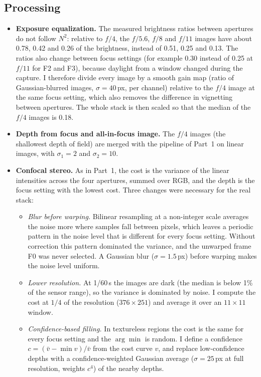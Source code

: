 \documentclass[11pt]{article}
\begin{document}
\subsection*{Processing}
\begin{itemize}\setlength{\itemsep}{2pt}
\item \textbf{Exposure equalization.} The measured brightness ratios between apertures do not follow $N^2$: relative to $f/4$, the $f/5.6$, $f/8$ and $f/11$ images have about 0.78, 0.42 and 0.26 of the brightness, instead of 0.51, 0.25 and 0.13. The ratios also change between focus settings (for example 0.30 instead of 0.25 at $f/11$ for F2 and F3), because daylight from a window changed during the capture. I therefore divide every image by a smooth gain map (ratio of Gaussian-blurred images, $\sigma=40$\,px, per channel) relative to the $f/4$ image at the same focus setting, which also removes the difference in vignetting between apertures. The whole stack is then scaled so that the median of the $f/4$ images is 0.18.
\item \textbf{Depth from focus and all-in-focus image.} The $f/4$ images (the shallowest depth of field) are merged with the pipeline of Part~1 on linear images, with $\sigma_1=2$ and $\sigma_2=10$.
\item \textbf{Confocal stereo.} As in Part~1, the cost is the variance of the linear intensities across the four apertures, summed over RGB, and the depth is the focus setting with the lowest cost. Three changes were necessary for the real stack:
\begin{itemize}\setlength{\itemsep}{0pt}
\item \emph{Blur before warping.} Bilinear resampling at a non-integer scale averages the noise more where samples fall between pixels, which leaves a periodic pattern in the noise level that is different for every focus setting. Without correction this pattern dominated the variance, and the unwarped frame F0 was never selected. A Gaussian blur ($\sigma=1.5$\,px) before warping makes the noise level uniform.
\item \emph{Lower resolution.} At 1/60\,s the images are dark (the median is below 1\% of the sensor range), so the variance is dominated by noise. I compute the cost at $1/4$ of the resolution ($376\times251$) and average it over an $11\times11$ window.
\item \emph{Confidence-based filling.} In textureless regions the cost is the same for every focus setting and the $\arg\min$ is random. I define a confidence $c=(\bar v-\min v)/\bar v$ from the cost curve $v$, and replace low-confidence depths with a confidence-weighted Gaussian average ($\sigma=25$\,px at full resolution, weights $c^4$) of the nearby depths.
\end{itemize}
\end{itemize}
\end{document}
